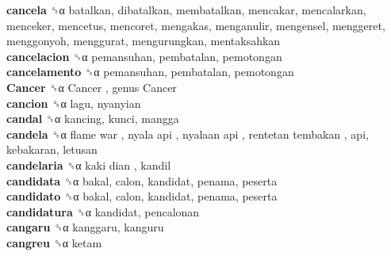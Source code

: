 \textbf{cancela} ␝α  batalkan, dibatalkan, membatalkan, mencakar, mencalarkan, menceker, mencetus, mencoret, mengakas, menganulir, mengensel, menggeret, menggonyoh, menggurat, mengurungkan, mentaksahkan  \\
\textbf{cancelacion} ␝α  pemansuhan, pembatalan, pemotongan  \\
\textbf{cancelamento} ␝α  pemansuhan, pembatalan, pemotongan  \\
\textbf{Cancer} ␝α   Cancer ,  genus Cancer   \\
\textbf{cancion} ␝α  lagu, nyanyian  \\
\textbf{candal} ␝α  kancing, kunci, mangga  \\
\textbf{candela} ␝α   flame war ,  nyala api ,  nyalaan api ,  rentetan tembakan , api, kebakaran, letusan  \\
\textbf{candelaria} ␝α   kaki dian , kandil  \\
\textbf{candidata} ␝α  bakal, calon, kandidat, penama, peserta  \\
\textbf{candidato} ␝α  bakal, calon, kandidat, penama, peserta  \\
\textbf{candidatura} ␝α  kandidat, pencalonan  \\
\textbf{cangaru} ␝α  kanggaru, kanguru  \\
\textbf{cangreu} ␝α  ketam  \\
